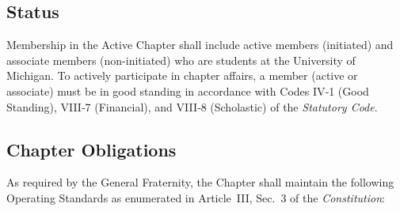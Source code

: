 \documentclass{article}
\begin{document}
\subsection{Status}

Membership in the Active Chapter shall include active members (initiated) and
associate members (non-initiated) who are students at the University of
Michigan. To actively participate in chapter affairs, a member (active or
associate) must be in good standing in accordance with Codes IV‑1 (Good
Standing), VIII‑7 (Financial), and VIII‑8 (Scholastic) of the \emph{Statutory
Code}.

\subsection{Chapter Obligations}

As required by the General Fraternity, the Chapter shall maintain the following
Operating Standards as enumerated in Article~III, Sec.~3 of the
\emph{Constitution}:
\end{document}
